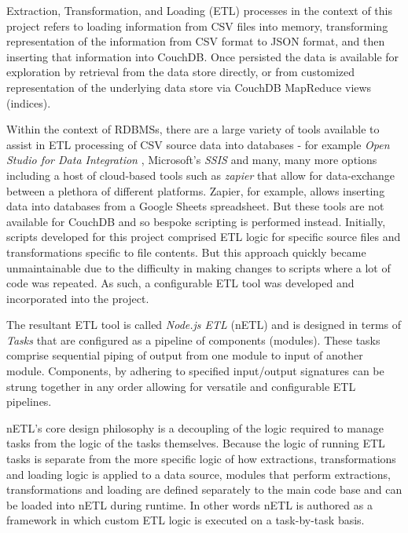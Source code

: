 Extraction, Transformation, and Loading (ETL) processes in the context of this project refers to loading information from CSV files into memory, transforming representation of the information from CSV format to JSON format, and then inserting that information into CouchDB. Once persisted the data is available for exploration by retrieval from the data store directly, or from customized representation of the underlying data store via CouchDB MapReduce views (indices).

Within the context of RDBMSs, there are a large variety of tools available to assist in ETL processing of CSV source data into databases - for example \textit{Open Studio for Data Integration} \cite{talend}, Microsoft's \textit{SSIS} \cite{ssis} and many, many more options including a host of cloud-based tools such as \textit{zapier} \cite{zapier} that allow for data-exchange between a plethora of different platforms. Zapier, for example, allows inserting data into databases from a Google Sheets spreadsheet. But these tools are not available for CouchDB and so bespoke scripting is performed instead. Initially, scripts developed for this project comprised ETL logic for specific source files and transformations specific to file contents. But this approach quickly became unmaintainable due to the difficulty in making changes to scripts where a lot of code was repeated. As such, a configurable ETL tool was developed and incorporated into the project.

The resultant ETL tool is called \textit{Node.js ETL} (nETL) and is designed in terms of \textit{Tasks} that are configured as a pipeline of components (modules). These tasks comprise sequential piping of output from one module to input of another module. Components, by adhering to specified input/output signatures can be strung together in any order allowing for versatile and configurable ETL pipelines.

nETL's core design philosophy is a decoupling of the logic required to manage tasks from the logic of the tasks themselves. Because the logic of running ETL tasks is separate from the more specific logic of how extractions, transformations and loading logic is applied to a data source, modules that perform extractions, transformations and loading are defined separately to the main code base and can be loaded into nETL during runtime. In other words nETL is authored as a framework in which custom ETL logic is executed on a task-by-task basis.